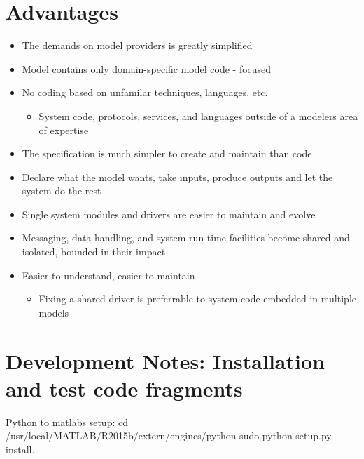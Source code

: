 \documentclass[letterpaper,10pt,english]{sphinxmanual}
\begin{document}
\section{Advantages}
\label{\detokenize{includeme:advantages}}\begin{itemize}
\item {} 
The demands on model providers is greatly simplified

\item {} 
Model contains only domain-specific model code - focused

\item {} 
No coding based on unfamilar techniques, languages, etc.
\begin{itemize}
\item {} 
System code, protocols, services, and languages outside of a
modelers area of expertise

\end{itemize}

\item {} 
The specification is much simpler to create and maintain than code

\item {} 
Declare what the model wants, take inputs, produce outputs and let
the system do the rest

\item {} 
Single system modules and drivers are easier to maintain and evolve

\item {} 
Messaging, data-handling, and system run-time facilities become
shared and isolated, bounded in their impact

\item {} 
Easier to understand, easier to maintain
\begin{itemize}
\item {} 
Fixing a shared driver is preferrable to system code embedded in
multiple models

\end{itemize}

\end{itemize}


\section{Development Notes: Installation and test code fragments}
\label{\detokenize{includeme:development-notes-installation-and-test-code-fragments}}
Python to matlabs setup: cd
/usr/local/MATLAB/R2015b/extern/engines/python sudo python setup.py
install.
\end{document}
